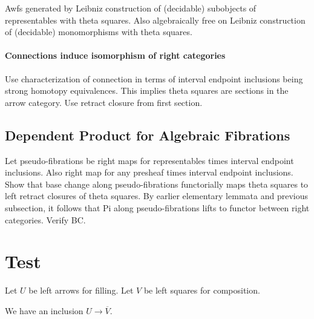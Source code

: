\documentclass[reqno,10pt,a4paper,oneside]{amsart}
\begin{document}
Awfs generated by Leibniz construction of (decidable) subobjects of representables with theta squares.
Also algebraically free on Leibniz construction of (decidable) monomorphisms with theta squares.

\paragraph{Connections induce isomorphism of right categories}

Use characterization of connection in terms of interval endpoint inclusions being strong homotopy equivalences.
This implies theta squares are sections in the arrow category.
Use retract closure from first section.

\subsection{Dependent Product for Algebraic Fibrations}

Let pseudo-fibrations be right maps for representables times interval endpoint inclusions.
Also right map for any presheaf times interval endpoint inclusions.
Show that base change along pseudo-fibrations functorially maps theta squares to left retract closures of theta squares.
By earlier elementary lemmata and previous subsection, it follows that Pi along pseudo-fibrations lifts to functor between right categories.
Verify BC.

\section{Test}

Let $U$ be left arrows for filling.
Let $V$ be left squares for composition.

We have an inclusion $U \to \overline{V}$.




\end{document}
